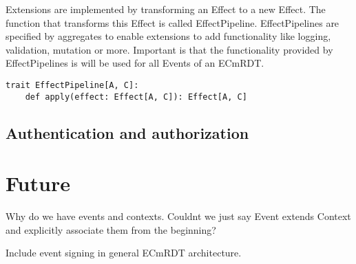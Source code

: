 \documentclass[
	ngerman,
	ruledheaders=section,   %
	class=report,		    %
	thesis={type=bachelor}, %
	accentcolor=9c,			%
	custommargins=false,    %
	marginpar=false,        %
	parskip=half-,          %
	fontsize=11pt,          %
]{tudapub}
\begin{document}
Extensions are implemented by transforming an Effect to a new Effect. The function that transforms this Effect is called EffectPipeline. EffectPipelines are specified by aggregates to enable extensions to add functionality like logging, validation, mutation or more. Important is that the functionality provided by EffectPipelines is will be used for all Events of an ECmRDT. 

\begin{lstlisting}
trait EffectPipeline[A, C]:
	def apply(effect: Effect[A, C]): Effect[A, C]
\end{lstlisting}

\section{Authentication and authorization}

\chapter{Future}
Why do we have events and contexts. Couldnt we just say Event extends Context and explicitly associate them from the beginning?

Include event signing in general ECmRDT architecture.
\end{document}
